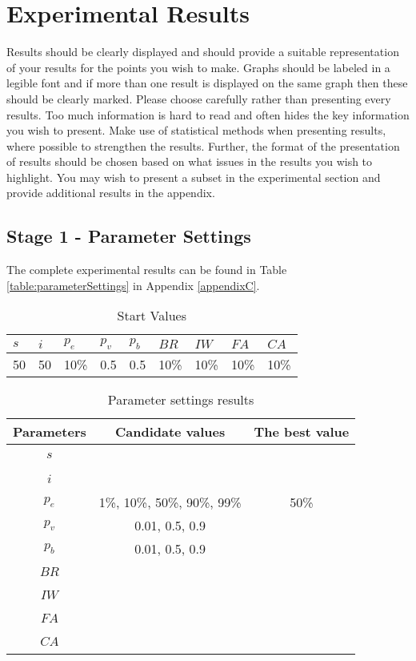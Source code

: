 \section{Experimental Results}

Results should be clearly displayed and should provide a suitable representation of your results for the points you wish to make. Graphs should be labeled in a legible font and if more than one result is displayed on the same graph then these should be clearly marked.   Please choose carefully rather than presenting every results. Too much information is hard to read and often hides the key information you wish to present. Make use of statistical methods when presenting results, where possible to strengthen the results.  Further, the format of the presentation of results should be chosen based on what issues in the results you wish to highlight. You may wish to present a subset in the experimental section and provide additional results in the appendix.

\subsection{Stage 1 - Parameter Settings}
\label{subsec:parameterSettings_results}

The complete experimental results can be found in Table \ref{table:parameterSettings} in Appendix \ref{appendixC}.

\begin{table}[H]
	\centering
    \begin{tabular}{|l|l|l|l|l|l|l|l|l|}
 	\hline
 	$s$ & $i$ & $p_{e}$ & $p_{v}$ & $p_{b}$ & $BR$  & $IW$ & $FA$ & $CA$  \\
 	\hline
    50 & 50 & 10\% & 0.5 & 0.5 & 10\% & 10\% & 10\%  & 10\%  \\
	\hline
    \end{tabular}
    \caption {Start Values}
    \label{table:parameter_startvalues}
	\end{table}

	\begin{table}[H]
	\centering
    \begin{tabular}{|c|c||c|}
 	\hline
 	Parameters & Candidate values & The best value\\
 	\hline
    $s$ & ~ & ~ \\
    $i$ & ~ & ~ \\
    $p_{e}$ & 1\%, 10\%, 50\%, 90\%, 99\% & 50\% \\
    $p_{v}$ & 0.01, 0.5, 0.9 & ~ \\
    $p_{b}$ & 0.01, 0.5, 0.9 & ~ \\
    $BR$ & ~ & ~ \\
    $IW$ & ~ & ~ \\
    $FA$ & ~ & ~ \\
    $CA$ & ~ & ~ \\
	\hline
    \end{tabular}
    \caption {Parameter settings results}
    \label{table:parameterSettings2}
	\end{table}

